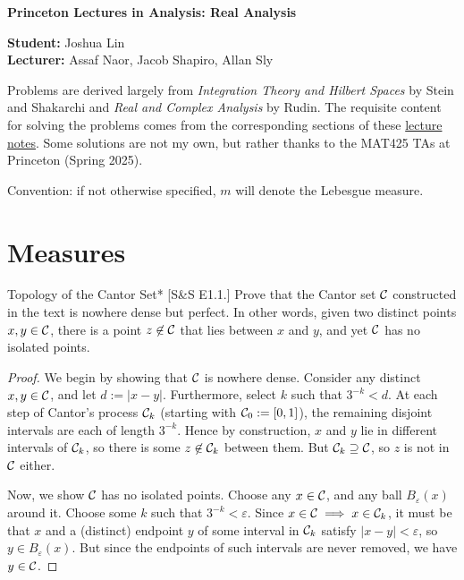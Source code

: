 






\begin{Large}
    \textsf{\textbf{Princeton Lectures in Analysis: Real Analysis}}
\end{Large}

\vspace{1ex}

\textsf{\textbf{Student:}} Joshua Lin \\
\textsf{\textbf{Lecturer:}} Assaf Naor, Jacob Shapiro, Allan Sly

\vspace{2ex}
Problems are derived largely from \emph{Integration Theory and Hilbert Spaces} by Stein and Shakarchi and \emph{Real and Complex Analysis} by Rudin. The requisite content for solving the problems comes from the corresponding sections of these \href{https://web.archive.org/web/20250630154205/https://web.math.princeton.edu/~js129/PDFs/teaching/MAT425_spring_2025/MAT425_Lecture_Notes.pdf}{lecture notes}. Some solutions are not my own, but rather thanks to the MAT425 TAs at Princeton (Spring 2025). 
\stdvspace

Convention: if not otherwise specified, \(m\) will denote the Lebesgue measure.

\section{Measures}

\begin{problem}{Topology of the Cantor Set}*
[S\&S E1.1.] Prove that the Cantor set \(\mathcal{C}\) constructed in the text is nowhere dense but perfect. In other words, given two distinct points \(x, y \in \mathcal{C}\), there is a point \(z \not\in \mathcal{C}\) that lies between \(x\) and \(y\), and yet \(\mathcal{C}\) has no isolated points. 
\end{problem}

\begin{proof}
    We begin by showing that \(\mathcal{C}\) is nowhere dense. Consider any distinct \(x, y \in \mathcal{C}\), and let \(d := |x - y|\). Furthermore, select \(k\) such that \(3^{-k} < d\). At each step of Cantor's process \(\mathcal{C}_k\) (starting with \(\mathcal{C}_0 := [0, 1]\)), the remaining disjoint intervals are each of length \(3^{-k}\). Hence by construction, \(x\) and \(y\) lie in different intervals of \(\mathcal{C}_k\), so there is some \(z \not\in \mathcal{C}_k\) between them. But \(\mathcal{C}_k \supseteq \mathcal{C}\), so \(z\) is not in \(\mathcal{C}\) either. 
    \stdvspace

    Now, we show \(\mathcal{C}\) has no isolated points. Choose any \(x \in \mathcal{C}\), and any ball \(B_{\varepsilon}(x)\) around it. Choose some \(k\) such that \(3^{-k} < \varepsilon\). Since \(x \in \mathcal{C} \implies x \in \mathcal{C}_k\), it must be that \(x\) and a (distinct) endpoint \(y\) of some interval in \(\mathcal{C}_k\) satisfy \(|x - y| < \varepsilon\), so \(y \in B_{\varepsilon}(x)\). But since the endpoints of such intervals are never removed, we have \(y \in \mathcal{C}\). 
\end{proof}

